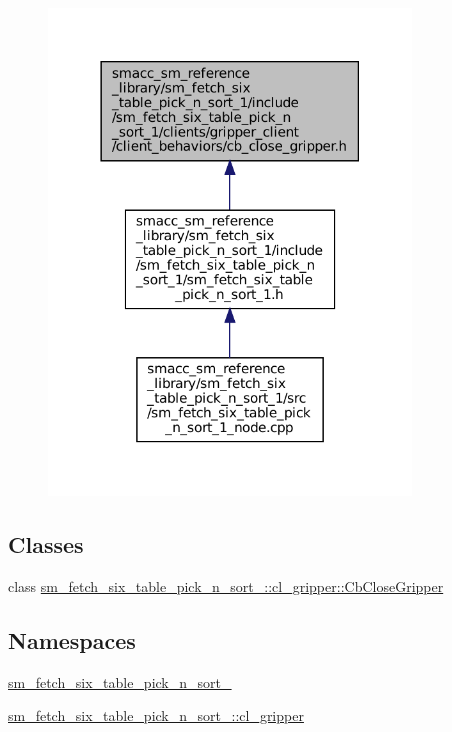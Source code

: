 \nopagebreak
\begin{figure}[H]
\begin{center}
\leavevmode
\includegraphics[width=273pt]{sm__fetch__six__table__pick__n__sort__1_2include_2sm__fetch__six__table__pick__n__sort__1_2clienbf0f31710539eea74b8a22e0ca87e493}
\end{center}
\end{figure}
\subsection*{Classes}
\begin{DoxyCompactItemize}
\item 
class \hyperlink{classsm__fetch__six__table__pick__n__sort__1_1_1cl__gripper_1_1CbCloseGripper}{sm\+\_\+fetch\+\_\+six\+\_\+table\+\_\+pick\+\_\+n\+\_\+sort\+\_\+::cl\+\_\+gripper\+::\+Cb\+Close\+Gripper}
\end{DoxyCompactItemize}
\subsection*{Namespaces}
\begin{DoxyCompactItemize}
\item 
 \hyperlink{namespacesm__fetch__six__table__pick__n__sort__1}{sm\+\_\+fetch\+\_\+six\+\_\+table\+\_\+pick\+\_\+n\+\_\+sort\+\_}
\item 
 \hyperlink{namespacesm__fetch__six__table__pick__n__sort__1_1_1cl__gripper}{sm\+\_\+fetch\+\_\+six\+\_\+table\+\_\+pick\+\_\+n\+\_\+sort\+\_\+::cl\+\_\+gripper}
\end{DoxyCompactItemize}
